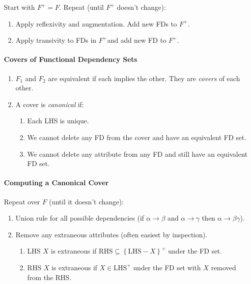 \documentclass[twocolumn,english]{article}
\begin{document}
Start with $F^{+}=F$. Repeat (until $F^{+}$ doesn't change):
\begin{enumerate}
\item Apply reflexivity and augmentation. Add new FDs to $F^{+}$.
\item Apply transivity to FDs in $F^{+}$and add new FD to $F^{+}$.
\end{enumerate}

\paragraph{Covers of Functional Dependency Sets}
\begin{enumerate}
\item $F_{1}$ and $F_{2}$ are equivalent if each implies the other. They
are \emph{covers} of each other.
\item A cover is \emph{canonical} if:

\begin{enumerate}
\item Each LHS is unique.
\item We cannot delete any FD from the cover and have an equivalent FD set.
\item We cannot delete any attribute from any FD and still have an equivalent
FD set.
\end{enumerate}
\end{enumerate}

\paragraph{Computing a Canonical Cover}

Repeat over $F$ (until it doesn't change):
\begin{enumerate}
\item Union rule for all possible dependencies (if $\alpha\rightarrow\beta$
and $\alpha\rightarrow\gamma$ then $\alpha\rightarrow\beta\gamma$).
\item Remove any extraneous attributes (often easiest by inspection).

\begin{enumerate}
\item LHS $X$ is extraneous if $\mbox{RHS}\subseteq\left\{ \mbox{LHS}-X\right\} ^{+}$
under the FD set.
\item RHS $X$ is extraneous if $X\in\mbox{LHS}^{+}$ under the FD set with
$X$ removed from the RHS.
\end{enumerate}
\end{enumerate}
\end{document}
